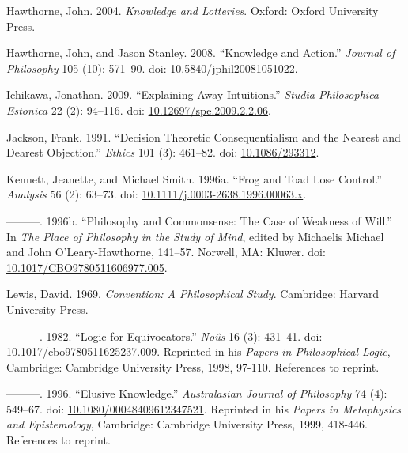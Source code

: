\documentclass[
  11pt,
  letterpaper,
  DIV=11,
  numbers=noendperiod,
  twoside]{scrartcl}
\newlength{\cslhangindent}
\newenvironment{CSLReferences}[2] %
 {\begin{list}{}{%
  \setlength{\itemindent}{0pt}
  \setlength{\leftmargin}{0pt}
  \setlength{\parsep}{0pt}
  \ifodd #1
   \setlength{\leftmargin}{\cslhangindent}
   \setlength{\itemindent}{-1\cslhangindent}
  \fi
  \setlength{\itemsep}{#2\baselineskip}}}
 {\end{list}}
\begin{document}
\begin{CSLReferences}{1}{0}
Hawthorne, John. 2004. \emph{Knowledge and Lotteries}. Oxford: Oxford
University Press.

Hawthorne, John, and Jason Stanley. 2008. {``{Knowledge and Action}.''}
\emph{Journal of Philosophy} 105 (10): 571--90. doi:
\href{https://doi.org/10.5840/jphil20081051022}{10.5840/jphil20081051022}.

Ichikawa, Jonathan. 2009. {``Explaining Away Intuitions.''} \emph{Studia
Philosophica Estonica} 22 (2): 94--116. doi:
\href{https://doi.org/10.12697/spe.2009.2.2.06}{10.12697/spe.2009.2.2.06}.

Jackson, Frank. 1991. {``Decision Theoretic Consequentialism and the
Nearest and Dearest Objection.''} \emph{Ethics} 101 (3): 461--82. doi:
\href{https://doi.org/10.1086/293312}{10.1086/293312}.

Kennett, Jeanette, and Michael Smith. 1996a. {``Frog and Toad Lose
Control.''} \emph{Analysis} 56 (2): 63--73. doi:
\href{https://doi.org/10.1111/j.0003-2638.1996.00063.x}{10.1111/j.0003-2638.1996.00063.x}.

---------. 1996b. {``Philosophy and Commonsense: The Case of Weakness of
Will.''} In \emph{The Place of Philosophy in the Study of Mind}, edited
by Michaelis Michael and John O'Leary-Hawthorne, 141--57. Norwell, MA:
Kluwer. doi:
\href{https://doi.org/10.1017/CBO9780511606977.005}{10.1017/CBO9780511606977.005}.

Lewis, David. 1969. \emph{Convention: A Philosophical Study}. Cambridge:
Harvard University Press.

---------. 1982. {``Logic for Equivocators.''} \emph{No{û}s} 16 (3):
431--41. doi:
\href{https://doi.org/10.1017/cbo9780511625237.009}{10.1017/cbo9780511625237.009}.
Reprinted in his \emph{Papers in Philosophical Logic}, Cambridge:
Cambridge University Press, 1998, 97-110. References to reprint.

---------. 1996. {``Elusive Knowledge.''} \emph{Australasian Journal of
Philosophy} 74 (4): 549--67. doi:
\href{https://doi.org/10.1080/00048409612347521}{10.1080/00048409612347521}.
Reprinted in his \emph{Papers in Metaphysics and Epistemology},
Cambridge: Cambridge University Press, 1999, 418-446. References to
reprint.


\end{CSLReferences}
\end{document}
